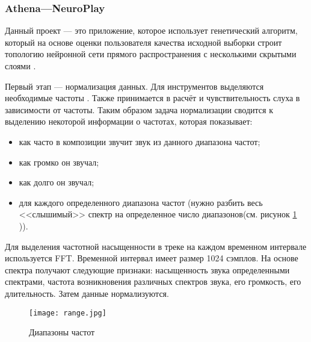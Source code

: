 \subsubsection {Athena—NeuroPlay}
Данный проект  — это приложение, которое использует генетический алгоритм, который на основе оценки пользователя качества исходной выборки строит топологию нейронной сети прямого распространения с несколькими скрытыми слоями \cite{athena}.

Первый этап —  нормализация данных. Для инструментов выделяются необходимые частоты . Также принимается в расчёт и чувствительность слуха в зависимости от частоты.
Таким образом задача нормализации сводится к выделению некоторой информации о частотах, которая показывает:
\begin{itemize}
\item как часто в композиции звучит звук из данного диапазона частот;
\item как громко он звучал;
\item как долго он звучал;
\item для каждого определенного диапазона частот (нужно разбить весь <<слышимый>> спектр на определенное число диапазонов(см. рисунок \ref{fig:domain:athena:range} )).
\end{itemize}




Для выделения частотной насыщенности в треке на каждом временном интервале используется FFT. Временной интервал имеет размер 1024 сэмплов. На основе спектра получают следующие признаки: насыщенность звука определенными спектрами, частота возникновения различных спектров звука, его громкость, его длительность. Затем данные нормализуются.

\begin{figure}[h]
\centering
  \texttt{[image: range.jpg]}  
  \caption{Диапазоны  частот}
  \label{fig:domain:athena:range}
\end{figure}

